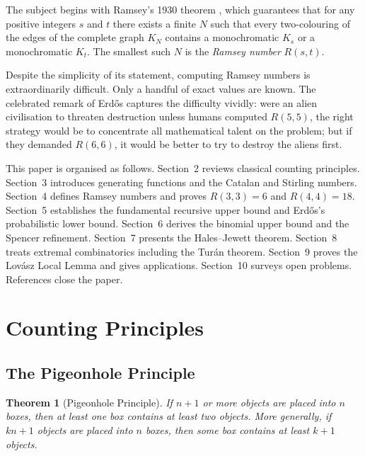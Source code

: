 \documentclass[12pt,a4paper]{amsart}
\newtheorem{theorem}{Theorem}[section]
\theoremstyle{definition}
\theoremstyle{remark}
\begin{document}
The subject begins with Ramsey's 1930 theorem \cite{Ramsey1930}, which guarantees
that for any positive integers $s$ and $t$ there exists a finite $N$ such that
every two-colouring of the edges of the complete graph $K_N$ contains a
monochromatic $K_s$ or a monochromatic $K_t$.  The smallest such $N$ is the
\emph{Ramsey number} $R(s,t)$.

Despite the simplicity of its statement, computing Ramsey numbers is extraordinarily
difficult.  Only a handful of exact values are known.  The celebrated remark of
Erd\H{o}s \cite{Erdos1947} captures the difficulty vividly: were an alien
civilisation to threaten destruction unless humans computed $R(5,5)$, the right
strategy would be to concentrate all mathematical talent on the problem; but if
they demanded $R(6,6)$, it would be better to try to destroy the aliens first.

This paper is organised as follows.  Section~2 reviews classical counting
principles.  Section~3 introduces generating functions and the Catalan and Stirling
numbers.  Section~4 defines Ramsey numbers and proves $R(3,3)=6$ and $R(4,4)=18$.
Section~5 establishes the fundamental recursive upper bound and Erd\H{o}s's
probabilistic lower bound.  Section~6 derives the binomial upper bound and the
Spencer refinement.  Section~7 presents the Hales--Jewett theorem.  Section~8
treats extremal combinatorics including the Tur\'an theorem.  Section~9 proves
the Lov\'asz Local Lemma and gives applications.  Section~10 surveys open problems.
References close the paper.

\section{Counting Principles}

\subsection{The Pigeonhole Principle}

\begin{theorem}[Pigeonhole Principle]\label{thm:pigeonhole}
If $n+1$ or more objects are placed into $n$ boxes, then at least one box
contains at least two objects.  More generally, if $kn+1$ objects are placed
into $n$ boxes, then some box contains at least $k+1$ objects.
\end{theorem}
\end{document}
